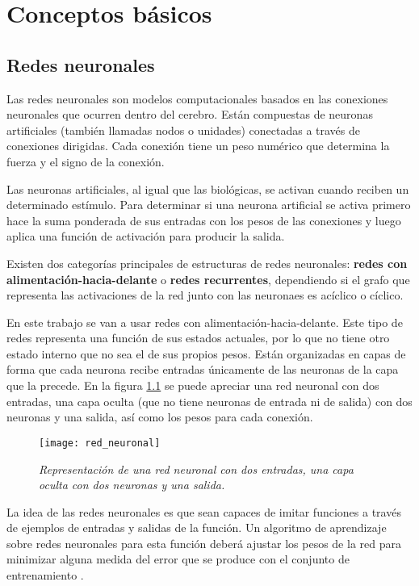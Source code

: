 \chapter{Conceptos básicos}
\label{BasicConcepts}



\section{Redes neuronales}
Las redes neuronales son modelos computacionales basados en las conexiones
neuronales que ocurren dentro del cerebro. Están compuestas de neuronas
artificiales (también llamadas nodos o unidades) conectadas a través de
conexiones dirigidas. Cada conexión tiene un peso numérico que determina la
fuerza y el signo de la conexión.

Las neuronas artificiales, al igual que las biológicas, se activan cuando
reciben un determinado estímulo. Para determinar si una neurona artificial se
activa primero hace la suma ponderada de sus entradas con los pesos de las
conexiones y luego aplica una función de activación para producir la salida.

Existen dos categorías principales de estructuras de redes neuronales:
\textbf{redes con alimentación-hacia-delante} o \textbf{redes recurrentes},
dependiendo si el grafo que representa las activaciones de la red junto con las
neuronaes es acíclico o cíclico.

En este trabajo se van a usar redes con alimentación-hacia-delante. Este tipo
de redes representa una función de sus estados actuales, por lo que no tiene
otro estado interno que no sea el de sus propios pesos. Están organizadas en
capas de forma que cada neurona recibe entradas únicamente de las neuronas de
la capa que la precede. En la figura \ref{red_neuronal} se puede apreciar una
red neuronal con dos entradas, una capa oculta (que no tiene neuronas de
entrada ni de salida) con dos neuronas y una salida, así como los pesos para
cada conexión.

\begin{figure}
    \centering
    \caption{\textit{Representación de una red neuronal con dos entradas, una
    capa oculta con dos neuronas y una salida.}}
  \label{red_neuronal}
  \texttt{[image: red\_neuronal]}
\end{figure}

La idea de las redes neuronales es que sean capaces de imitar funciones a través
de ejemplos de entradas y salidas de la función. Un algoritmo de aprendizaje
sobre redes neuronales para esta función deberá ajustar los pesos de la red para
minimizar alguna medida del error que se produce con el conjunto de
entrenamiento \parencite{russel_norvig}.


